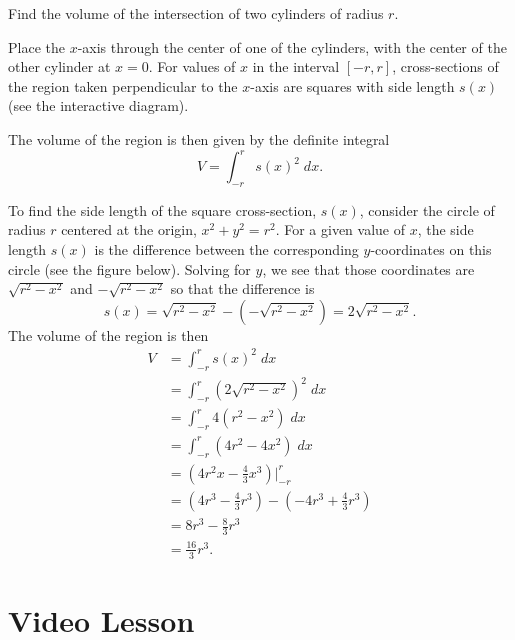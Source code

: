 \documentclass{ximera}
\begin{document}
\begin{example}  Find the volume of the intersection of two cylinders of radius $r$. 


Place the $x$-axis through the center of one of the cylinders, with the center of the other cylinder at $x = 0$.
For values of $x$ in the interval $[-r, r]$, cross-sections of the region taken perpendicular 
to the $x$-axis are squares with side length $s(x)$ (see the interactive diagram). 

The volume of the region is then given by the definite integral
\[
V = \int_{-r}^r s(x)^2 \; dx.
\]

To find the side length of the square cross-section, $s(x)$, consider the circle of radius $r$ centered at the origin, $x^2 + y^2 = r^2$. For a given value of $x$, the side 
length $s(x)$ is the difference between the corresponding $y$-coordinates on this circle (see the figure below). Solving for $y$, we see that those coordinates are 
$\sqrt{r^2 - x^2}$ and $-\sqrt{r^2 - x^2}$ so that the difference is 
\[
s(x) = \sqrt{r^2 - x^2}-(-\sqrt{r^2 - x^2}) = 2\sqrt{r^2 - x^2}.
\]
The volume of the region  is then
\begin{align*}
V &= \int_{-r}^r s(x)^2 \; dx\\
  &= \int_{-r}^r \left(2\sqrt{r^2 - x^2}\right)^2 \; dx\\
  &= \int_{-r}^r 4(r^2 - x^2) \; dx\\
  &= \int_{-r}^r (4r^2 - 4x^2) \; dx\\
  &= \left(4r^2x - \frac43x^3\right)\bigg|_{-r}^r\\
  &= \left(4r^3 - \frac43r^3\right) - \left(-4r^3 + \frac43 r^3\right)\\
  &= 8r^3 - \frac83 r^3\\
  &= \frac{16}{3} r^3.
\end{align*}

\end{example}



\section{Video Lesson}

\begin{center}
\begin{foldable}
\end{foldable}
\end{center}
\end{document}
